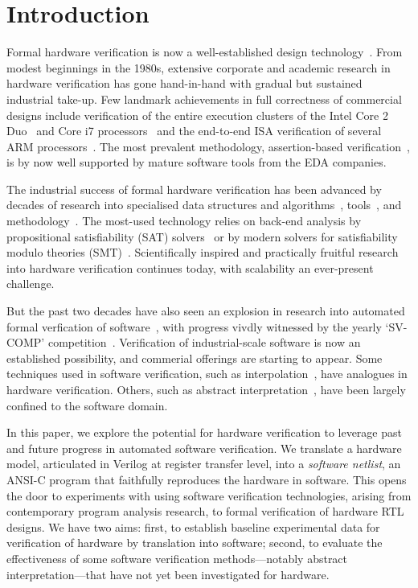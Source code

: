 \section{Introduction}\label{sec:intro}

Formal hardware verification is now a well-established design
technology~\cite{Seligman:2015:FV}.  From modest beginnings in the 1980s,
extensive corporate and academic research in hardware verification has gone
hand-in-hand with gradual but sustained industrial take-up.  Few landmark
achievements in full correctness of commercial designs include verification
of the entire execution clusters of the Intel Core 2 Duo~\cite{Core2}  and
Core i7 processors~\cite{i7} and the end-to-end ISA verification of several
ARM processors~\cite{ARM}.  The most prevalent methodology, assertion-based
verification~\cite{Foster:2009:AAB}, is by now well supported by mature
software tools from the EDA companies.

The industrial success of formal hardware verification has been advanced by
decades of research into specialised data structures and
algorithms~\cite{ic3, fmcad2000, ken, biere, STE},
tools~\cite{Seger:2005:IEE, abc, ebmc, vis, cadence, synopsysfv}, and
methodology~\cite{MCMILLAN2000279, Aagaard:2000:MLH, uclid, word-term,
word-bmc, DBLP:conf/lpar/AndrausLS08}.  The most-used technology relies on
back-end analysis by propositional satisfiability (SAT)
solvers~\cite{Biere1999} or by modern solvers for satisfiability modulo
theories (SMT)~\cite{decision_procedures,
DBLP:conf/lpar/AndrausLS08,soc-keating,
DBLP:conf/mtv/SunkariCVM07,DBLP:conf/cav/Bjesse08}.  Scientifically inspired
and practically fruitful research into hardware verification continues
today, with scalability an ever-present challenge.

But the past two decades have also seen an explosion in research into
automated formal verfication of software~\cite{dkw2008}, with progress
vivdly witnessed by the yearly `SV-COMP' competition~\cite{Beyer2017}. 
Verification of industrial-scale software is now an established possibility,
and commerial offerings are starting to appear.  Some techniques used in
software verification, such as interpolation~\cite{Interpolants,
Kroening:2011:ISV}, have analogues in hardware verification.  Others, such
as abstract interpretation~\cite{CousotCousot77, Cousot:1996:AI}, have been
largely confined to the software domain.

In this paper, we explore the potential for hardware verification to
leverage past and future progress in automated software verification.  We
translate a hardware model, articulated in Verilog at register transfer
level, into a \emph{software netlist}, an ANSI-C program that faithfully
reproduces the hardware in software.  This opens the door to experiments
with using software verification technologies, arising from contemporary
program analysis research, to formal verification of hardware RTL designs. 
We have two aims: first, to establish baseline experimental data for
verification of hardware by translation into software; second, to evaluate
the effectiveness of some software verification methods---notably abstract
interpretation---that have not yet been investigated for hardware.

